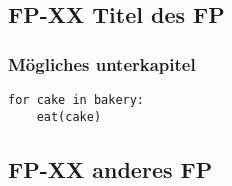 \subsection{FP-XX Titel des FP}				%
\subsubsection{Mögliches unterkapitel}		%
\begin{verbatim}
for cake in bakery:
	eat(cake)
\end{verbatim}


\subsection{FP-XX anderes FP}


